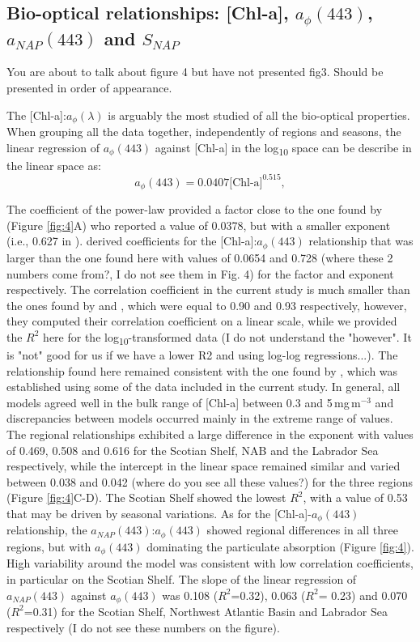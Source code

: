 \documentclass[utf8]{frontiersSCNS} %
\begin{document}
\subsection{Bio-optical relationships: [Chl-a], $a_\phi(443)$, $a_{NAP}(443)$ and  $S_{NAP}$}\label{phytoabs}

You are about to talk about figure 4 but have not presented fig3. Should be presented in order of appearance.

The [Chl-a]:$a_\phi(\lambda)$ is arguably the most studied of all the bio-optical properties. When grouping all the data together, independently of regions and seasons, the linear regression of $a_\phi(443)$ against [Chl-a] in the log\textsubscript{10} space can be describe in the linear space as:
\begin{equation}
a_\phi(443) = 0.0407 \text{[Chl-a]}^{0.515},
\end{equation}\label{eq:3}

The coefficient of the power-law provided a factor close to the one found by \cite{bricaud1998} (Figure \ref{fig:4}A) who reported a value of 0.0378, but with a smaller exponent (i.e., 0.627 in \cite{bricaud1998}). \cite{bricaud2004} derived coefficients for the [Chl-a]:$a_\phi(443)$ relationship that was larger than the one found here with values of 0.0654 and 0.728 (where these 2 numbers come from?, I do not see them in Fig. 4) for the factor and exponent respectively. The correlation coefficient in the current study is much smaller than the ones found by \cite{bricaud1998} and \cite{bricaud2004}, which were equal to 0.90 and 0.93 respectively, however, they computed their correlation coefficient on a linear scale, while we provided the $R^2$ here for the log\textsubscript{10}-transformed data (I do not understand the "however". It is "not" good for us if we have a lower R2 and using log-log regressions...). The relationship found here remained consistent with the one found by \cite{devred2006}, which was established using some of the data included in the current study. In general, all models agreed well in the bulk range of [Chl-a] between 0.3 and 5\,mg\,m$^{-3}$ and discrepancies between models occurred mainly in the extreme range of values. The regional relationships exhibited a large difference in the exponent with values of 0.469, 0.508 and 0.616 for the Scotian Shelf, NAB and the Labrador Sea respectively, while the intercept in the linear space remained similar and varied between 0.038 and 0.042 (where do you see all these values?) for the three regions (Figure \ref{fig:4}C-D). The Scotian Shelf showed the lowest $R^2$, with a value of 0.53 that may be driven by seasonal variations. As for the [Chl-a]-$a_\phi(443)$ relationship, the $a_{NAP}(443)$:$a_\phi(443)$ showed regional differences in all three regions, but with $a_\phi(443)$ dominating the particulate absorption (Figure \ref{fig:4}). High variability around the model was consistent with low correlation coefficients, in particular on the Scotian Shelf. The slope of the linear regression of $a_{NAP}(443)$ against $a_\phi(443)$ was 0.108 ($R^2$=0.32), 0.063 ($R^2$= 0.23) and 0.070 ($R^2$=0.31)  for the Scotian Shelf, Northwest Atlantic Basin and Labrador Sea respectively (I do not see these numbers on the figure).
\end{document}
